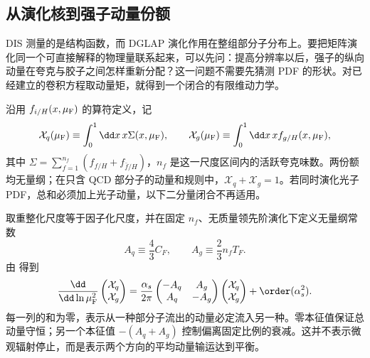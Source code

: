 \subsection{从演化核到强子动量份额}
\label{sec:qcd-momentum-evolution-applications}

DIS 测量的是结构函数，而 DGLAP 演化作用在整组部分子分布上。要把矩阵演化同一个可直接解释的物理量联系起来，可以先问：提高分辨率以后，强子的纵向动量在夸克与胶子之间怎样重新分配？这一问题不需要先猜测 PDF 的形状。对已经建立的卷积方程取动量矩，就得到一个闭合的有限维动力学。

沿用 $f_{i/H}(x,\mu_{\rm F})$ 的算符定义，记
\begin{equation}
 \mathcal X_q(\mu_{\rm F})\equiv\int_0^1\dd x\,x\Sigma(x,\mu_{\rm F}),
 \qquad
 \mathcal X_g(\mu_{\rm F})\equiv\int_0^1\dd x\,x f_{g/H}(x,\mu_{\rm F}),
 \label{eq:qcd-momentum-fractions}
\end{equation}
其中 $\Sigma=\sum_{f=1}^{n_f}(f_{f/H}+f_{\bar f/H})$，$n_f$ 是这一尺度区间内的活跃夸克味数。两份额均无量纲；在只含 QCD 部分子的动量和规则中，$\mathcal X_q+\mathcal X_g=1$。若同时演化光子 PDF，总和必须加上光子动量，以下二分量闭合不再适用。

取重整化尺度等于因子化尺度，并在固定 $n_f$、无质量领先阶演化下定义无量纲常数
\begin{equation*}
 A_q\equiv\frac43C_F,\qquad A_g\equiv\frac23n_fT_F.
\end{equation*}
由 得到
\begin{equation}
 \frac{\dd}{\dd\ln\mu_{\rm F}^2}
 \begin{pmatrix}\mathcal X_q\\\mathcal X_g\end{pmatrix}
 =\frac{\alpha_s}{2\pi}
 \begin{pmatrix}-A_q&A_g\\A_q&-A_g\end{pmatrix}
 \begin{pmatrix}\mathcal X_q\\\mathcal X_g\end{pmatrix}
 +\order(\alpha_s^2).
 \label{eq:qcd-momentum-matrix}
\end{equation}
每一列的和为零，表示从一种部分子流出的动量必定流入另一种。零本征值保证总动量守恒；另一个本征值 $-(A_q+A_g)$ 控制偏离固定比例的衰减。这并不表示微观辐射停止，而是表示两个方向的平均动量输运达到平衡。

